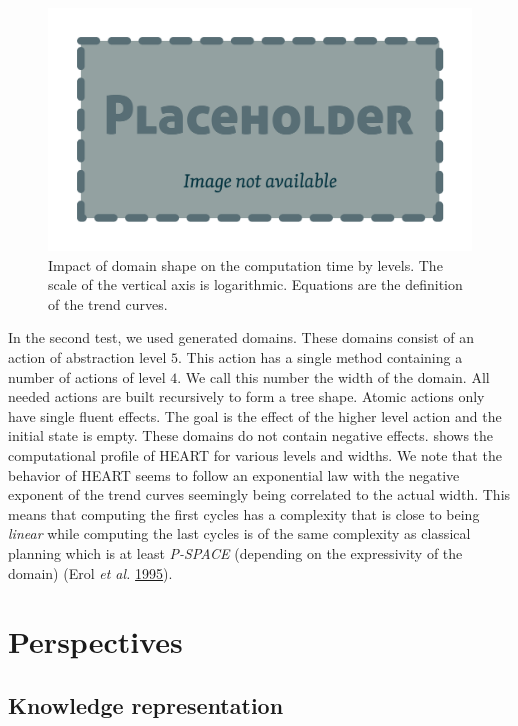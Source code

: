 \documentclass[11pt,a4paper,twoside,openright,titlepage,numbers=noenddot,headinclude,cleardoublepage=empty,openany]{scrreprt}
\theoremstyle{plain}
\theoremstyle{definition}
\theoremstyle{remark}
\begin{document}
\begin{figure}
\hypertarget{fig:width}{%
\centering
\includegraphics{./tex2pdf.-0b80fea6fd6da7f9/85c5abcb21612ede4db12ac6fcfd32ed24ed57eb.pdf}
\caption{Impact of domain shape on the computation time by levels. The
scale of the vertical axis is logarithmic. Equations are the definition
of the trend curves.}\label{fig:width}
}
\end{figure}

In the second test, we used generated domains. These domains consist of
an action of abstraction level \(5\). This action has a single method
containing a number of actions of level \(4\). We call this number the
width of the domain. All needed actions are built recursively to form a
tree shape. Atomic actions only have single fluent effects. The goal is
the effect of the higher level action and the initial state is empty.
These domains do not contain negative effects.  shows
the computational profile of HEART for various levels and widths. We
note that the behavior of HEART seems to follow an exponential law with
the negative exponent of the trend curves seemingly being correlated to
the actual width. This means that computing the first cycles has a
complexity that is close to being \emph{linear} while computing the last
cycles is of the same complexity as classical planning which is at least
\emph{P-SPACE} (depending on the expressivity of the domain) (Erol
\emph{et al.} \protect\hyperlink{ref-erol_complexity_1995}{1995}).

\hypertarget{perspectives}{%
\chapter{Perspectives}\label{perspectives}}

\hypertarget{knowledge-representation-1}{%
\section{Knowledge representation}\label{knowledge-representation-1}}
\end{document}
